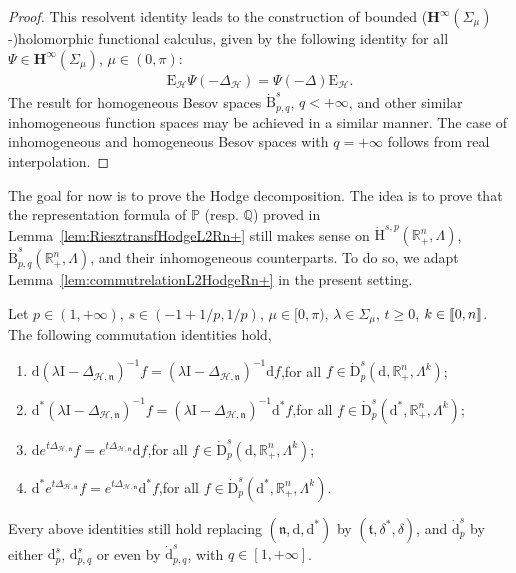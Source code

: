 \documentclass[AHL,Unicode,longabstracts,published]{cedram}
\newcommand{\bbP}{\mathbb{P}}
\newcommand{\bbR}{\mathbb{R}}
\newcommand{\bbQ}{\mathbb{Q}}
\newcommand{\rmH}{\mathrm{H}}%
\newcommand{\rmB}{\mathrm{B}}
\newcommand{\rmd}{\mathrm{d}}
\newcommand{\rmD}{\mathrm{D}}
\newcommand{\rmE}{\mathrm{E}}
\newcommand{\rmI}{\mathrm{I}}
\newcommand{\clH}{\mathcal{H}}
\newcommand{\bfH}{\mathbf{H}}
\newcommand{\fkn}{\mathfrak{n}}
\newcommand{\fkt}{\mathfrak{t}}
\newcommand{\llbracket}{\mathopen{[\mkern -2.7mu[}}
\newcommand{\rrbracket}{\mathclose{]\mkern -2.7mu]}}
\newcommand{\llb}{\llbracket}
\newcommand{\rrb}{\rrbracket}
\begin{document}
\begin{proof}
This resolvent identity leads to the construction of bounded ($\bfH^\infty(\Sigma_\mu)$-)holomorphic functional calculus, given by the following identity for all $\Psi\in \bfH^{\infty}(\Sigma_\mu)$, $\mu\in(0,\pi)$:
\begin{align*}
\rmE _\clH\Psi(-\Delta_{\clH}) = \Psi(-\Delta)\rmE _\clH .
\end{align*}
The result for homogeneous Besov spaces $\dot{\rmB}^{s}_{p,q}$, $q<+\infty$, and other similar inhomogeneous function spaces may be achieved in a similar manner. The case of inhomogeneous and homogeneous Besov spaces with $q=+\infty$ follows from real interpolation.
\end{proof}

The goal for now is to prove the Hodge decomposition. The idea is to prove that the representation formula of $\bbP$ (resp. $\bbQ$) proved in Lemma~\ref{lem:RiesztransfHodgeL2Rn+} still makes sense on $\dot{\rmH}^{s,p}(\bbR^n_+,\Lambda)$, $\dot{\rmB}^{s}_{p,q}(\bbR^n_+,\Lambda)$, and their inhomogeneous counterparts. To do so, we adapt Lemma~\ref{lem:commutrelationL2HodgeRn+} in the present setting.


\begin{lemm}\label{lem:commutrelationHspBspqHodgeRn+}
Let $p\in(1,+\infty)$, $s\in(-1+1/p,1/p)$, $\mu\in[0,\pi)$, $\lambda\in\Sigma_\mu$, $t\geqslant0$, $k\in\llb 0,n\rrb$. The following commutation identities hold,
\begin{enumerate}
\item\label{lemm2.30.1} $\rmd(\lambda \rmI  - \Delta_{\clH,\fkn})^{-1}f = (\lambda \rmI  - \Delta_{\clH,\fkn})^{-1}\rmd f$,\quad for all $f\in\dot{\rmD}^s_{p}(\rmd,\bbR^n_+,\Lambda^k)$;
\item\label{lemm2.30.2} $\rmd^\ast(\lambda \rmI  - \Delta_{\clH,\fkn})^{-1}f = (\lambda \rmI  - \Delta_{\clH,\fkn})^{-1}\rmd^\ast f$,\quad for all $f\in\dot{\rmD}^s_{p}(\rmd^\ast,\bbR^n_+,\Lambda^k)$;
\item\label{lemm2.30.3} $\rmd e^{t\Delta_{\clH,\fkn}}f = e^{t\Delta_{\clH,\fkn}}\rmd f$,\quad for all $f\in\dot{\rmD}^s_{p}(\rmd,\bbR^n_+,\Lambda^k)$;
\item\label{lemm2.30.4} $\rmd^\ast e^{t\Delta_{\clH,\fkn}}f = e^{t\Delta_{\clH,\fkn}}\rmd^\ast f$,\quad for all $f\in\dot{\rmD}^s_{p}(\rmd^\ast,\bbR^n_+,\Lambda^k)$.
\end{enumerate}
Every above identities still hold replacing $(\fkn,\rmd,\rmd^\ast)$ by $(\fkt,\delta^\ast,\delta)$, and $\dot{\rmd}^s_{p}$ by either ${\rmd}^s_{p}$, ${\rmd}^s_{p,q}$ or even by $\dot{\rmd}^s_{p,q}$, with $q\in[1,+\infty]$.
\end{lemm}
\end{document}

